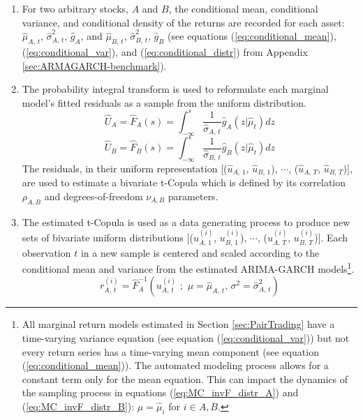 \documentclass[12pt]{report}
\begin{document}
\begin{enumerate}
    \item For two arbitrary stocks, $A$ and $B$, the conditional mean, conditional variance, and conditional density of the returns are recorded for each asset: $\hat{\mu}_{A,\,t}$, $\hat{\sigma}^{2}_{A,\,t}$, $\hat{g}_{A}$, and $\hat{\mu}_{B,\,t}$, $\hat{\sigma}^{2}_{B,\,t}$, $\hat{g}_{B}$ (see equations (\ref{eq:conditional_mean}), (\ref{eq:conditional_var}), and (\ref{eq:conditional_distr}) from Appendix \ref{sec:ARMAGARCH-benchmark}).
    \item The probability integral transform is used to reformulate each marginal model's fitted residuals as a sample from the uniform distribution.
    \begin{equation} \label{eq:MC_F_distr_A}
        \hat{U}_{A} = \hat{F}_{A}(s) = \int_{-\infty}^{s} \frac{1}{\hat{\sigma}_{A,\,t}} \hat{g}_{A} \left(z | \hat{\mu}_{t}\right) dz
    \end{equation}
    \begin{equation} \label{eq:MC_F_distr_B}
        \hat{U}_{B} = \hat{F}_{B}(s) = \int_{-\infty}^{s} \frac{1}{\hat{\sigma}_{B,\,t}} \hat{g}_{B} \left(z | \hat{\mu}_{t}\right) dz
    \end{equation}
    The residuals, in their uniform representation [($\hat{u}_{A,\,1}$, $\hat{u}_{B,\,1}$), $\cdots$, ($\hat{u}_{A,\,T}$, $\hat{u}_{B,\,T}$)], are used to estimate a bivariate t-Copula which is defined by its correlation $\rho_{A,B}$ and degrees-of-freedom $\nu_{A,B}$ parameters.
    \item The estimated t-Copula is used as a data generating process to produce new sets of bivariate uniform distributions [($u^{(i)}_{A,\,1}$, $u^{(i)}_{B,\,1}$), $\cdots$, ($u^{(i)}_{A,\,T}$, $u^{(i)}_{B,\,T}$)]. Each observation $t$ in a new sample is centered and scaled according to the conditional mean and variance from the estimated ARIMA-GARCH models\footnote{All marginal return models estimated in Section \ref{sec:PairTrading} have a time-varying variance equation (see equation (\ref{eq:conditional_var})) but not every return series has a time-varying mean component (see equation (\ref{eq:conditional_mean})). The automated modeling process allows for a constant term only for the mean equation. This can impact the dynamics of the sampling process in equations (\ref{eq:MC_invF_distr_A}) and (\ref{eq:MC_invF_distr_B}): $\mu=\hat{\mu}_{i}$ for $i \in {A,B}$.}.
    \begin{equation} \label{eq:MC_invF_distr_A}
        r^{(i)}_{A,\,t} = \hat{F}^{-1}_{A} \left(u^{(i)}_{A,\,t}\,\,;\,\, \mu=\hat{\mu}_{A,\,t},\, \sigma^{2}=\hat{\sigma}^{2}_{A,\,t} \right)

\end{equation}
\end{enumerate}
\end{document}
